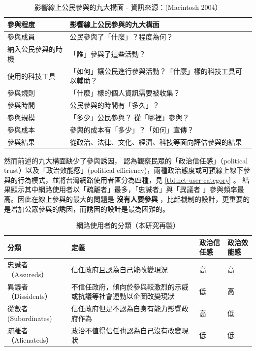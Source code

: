 \documentclass[12pt,a4paper]{article}
\begin{document}
\begin{table}[htbp]
\caption{\label{tab:orgf79b69f}
影響線上公民參與的九大構面 - 資訊來源：(Macintosh 2004）}
\centering
\begin{tabular}{ll}
\toprule
參與程度 & 影響線上公民參與的九大構面\\
\midrule
參與成員 & 公民參與了「什麼」？程度為何？\\
納入公民參與的時機 & 「誰」參與了這些活動？\\
使用的科技工具 & 「如何」讓公民進行參與活動？「什麼」樣的科技工具可以輔助？\\
參與規則 & 「什麼」樣的個人資訊需要被收集？\\
參與時間 & 公民參與的時間有「多久」？\\
參與規模 & 「多少」公民參與？  從「哪裡」參與？\\
參與成本 & 參與的成本有「多少」？「如何」宣傳？\\
參與結果 & 從政治、法律、文化、經濟、科技等面向評估參與的結果\\
\bottomrule
\end{tabular}
\end{table}

然而前述的九大構面缺少了參與誘因，\citep*{wang17}  認為觀察民眾的「政治信任感」（political trust）以及「政治效能感」(political efficiency)，兩種政治態度或可預線上線下參與的行為模式，並將台灣網路使用者區分為四種，見 \ref{tbl:net-user-category} 。
結果顯示其中網路使用者以「疏離者」最多，「忠誠者」與「異議者 」參與頻率最高。因此在線上參與的最大的問題是 \textbf{沒有人要參與} ，比起機制的設計，更重要的是增加公眾參與的誘因，而誘因的設計是最為困難的。

\begin{table}[htbp]
\caption{\label{tab:orgeaffe17}
網路使用者的分類（本研究再製）}
\centering
\begin{tabular}{llll}
\toprule
分類 & 定義 & 政治信任感 & 政治效能感\\
\midrule
忠誠者（Assureds） & 信任政府且認為自己能改變現況 & 高 & 高\\
異議者（Dissidents） & 不信任政府，傾向於參與較激烈的示威或抗議等社會運動以企圖改變現狀 & 低 & 高\\
從數者 (Subordinates) & 信任政府但是不認為自身有能力影響政府作為 & 高 & 低\\
疏離者（Alienateds） & 政治不值得信任也認為自己沒有改變現狀 & 低 & 低\\
\bottomrule
\end{tabular}
\end{table}
\end{document}
